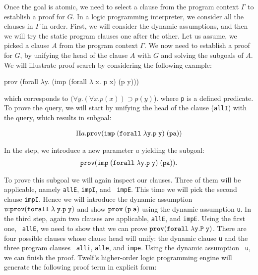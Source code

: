 \documentclass{llncs}
\newcommand{\pfLF}{{\tt{prov}}}
\newcommand{\impLF}{\tt{imp}\;}
\newcommand{\forallLF}{\tt{forall}\;}
\newcommand{\impl}{\supset}
\begin{document}
Once the goal is atomic, we need to select a clause from the
program context $\Gamma$ to establish a proof for $G$. In a logic
programming interpreter, we consider all the clauses in $\Gamma$ in order. 
First, we will consider the dynamic assumptions, and then we will try
the static program clauses one after the other. 
Let us assume, we picked a clause $A$ from the program context
$\Gamma$. We now need to establish a proof for $G$, by unifying the
head of the clause $A$ with $G$ and solving the subgoals of $A$.
We will illustrate proof search by considering the following example:  

\begin{code}
prov (forall $\lambda$y. (imp (forall $\lambda$ x. p x) (p y)))  
\end{code}

which corresponds to $(\forall y. (\forall x.p(x)) \impl p(y)$).  
where {\tt p} is a defined predicate. To prove the query, we will
start by unifying the head of the clause ({\tt allI}) with the
query, which results in subgoal:  

\[
\begin{array}{c}
\Pi a. \pfLF ( \impLF (\forallLF \lambda y. p\; y)\; (p a))
\end{array}
\]

In the {} step, we introduce a new parameter $a$
yielding the subgoal:
\[
\begin{array}{c}
\pfLF ( \impLF (\forallLF \lambda y. p\; y)\; (p a)).
\end{array}
\]

To prove this subgoal we will again inspect our clauses. Three of them
will be applicable, namely {\tt allE}, {\tt impI}, and {\tt
  impE}. This time we will pick the second clause {\tt impI}. Hence we
will introduce the dynamic assumption ${\tt{u}} {:} \pfLF (\forallLF
\lambda \;y. p\; y)$ and show $\pfLF\; {\tt (p\; a)}$ using the dynamic
assumption {\tt{u}}. In the third step, again two clauses are
applicable,  {\tt allE}, and {\tt impE}. Using the first one, {\tt
  allE}, we need to show that we can prove $\pfLF (\forallLF \lambda
y. P\; y)$. There are four possible clauses whose clause head will
unify: the dynamic clause {\tt u} and the three program clauses {\tt
  alli}, {\tt alle}, and {\tt impe}. Using the dynamic assumption {\tt
  u}, we can finish the proof. Twelf's
higher-order logic programming engine will generate the following
proof term in explicit form:  
\end{document}
